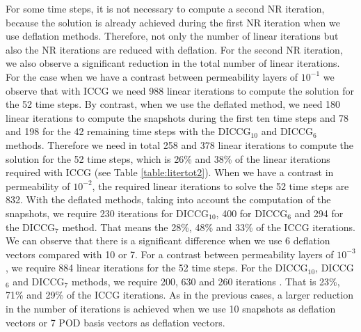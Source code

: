 \documentclass[12pt]{article}
\begin{document}
For some time steps, it is not necessary to compute a second NR iteration, because the solution is already achieved
during the first NR iteration when we use deflation methods. Therefore, not only the number of linear iterations
but also the NR iterations are reduced with deflation.
For the second NR iteration, we also observe a significant reduction in the total number of linear iterations.
For the case when we have a contrast between permeability layers of $10^{-1}$ we observe that with ICCG we need
988 linear iterations to compute the solution for the 52 time steps. By contrast, when we use the deflated method,
we need 180 linear iterations to compute the snapshots during the first ten time steps and 78 and 198 for the 42
remaining time steps with the DICCG$_{10}$ and DICCG$_6$ methods. Therefore we need in total 258 and 378 linear
iterations to compute the solution for the 52 time steps, which is 26\% and 38\% of the linear iterations required
with ICCG (see Table \ref{table:litertot2}).
When we have a contrast in permeability of $10^{-2}$, the required linear iterations to solve the 52 time steps
are 832. With the deflated methods, taking into account the computation of the snapshots, we require 230  iterations
for DICCG$_{10}$, 400 for DICCG$_6$ and 294 for the DICCG$_7$ method. That means the 28\%, 48\% and 33\% of the
ICCG iterations. We can observe that there is a significant difference when we use 6 deflation vectors compared
with 10 or 7. 
For a contrast between permeability layers of $10^{-3}$, we require 884 linear iterations for the 52 time steps.
For the DICCG$_{10}$, DICCG$_6$ and DICCG$_7$ methods, we require 200, 630 and 260 iterations . That is 23\%, 71\%
and 29\% of the ICCG iterations. As in the previous cases, a larger reduction in the number of iterations is 
achieved when we use 10 snapshots as deflation vectors or 7 POD basis vectors as deflation vectors.
\end{document}

